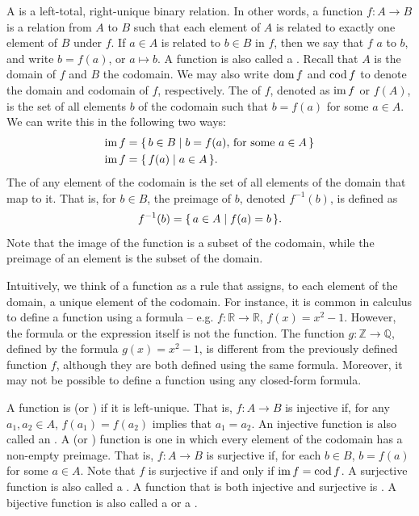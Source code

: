 A  is a left-total, right-unique binary relation. In other words, a function $f \colon A \to B$ is a relation from $A$ to $B$ such that each element of $A$ is related to exactly one element of $B$ under $f$. If $a \in A$ is related to $b \in B$ in $f$, then we say that $f$  $a$ to $b$, and write $b = f(a)$, or $a \mapsto b$. A function is also called a . Recall that $A$ is the domain of $f$ and $B$ the codomain. We may also write $\operatorname{dom} f$ and $\operatorname{cod} f$ to denote the domain and codomain of $f$, respectively. The  of $f$, denoted as $\operatorname{im} f$ or $f(A)$, is the set of all elements $b$ of the codomain such that $b = f(a)$ for some $a \in A$. We can write this in the following two ways:
\begin{align*}
\operatorname{im} f & = \qty{\, b \in B \mid b = f(a),\, \text{for some}~ a \in A \,} \\
\operatorname{im} f & = \qty{\, f(a) \mid a \in A \,}.
\end{align*}
The  of any element of the codomain is the set of all elements of the domain that map to it. That is, for $b \in B$, the preimage of $b$, denoted $f^{-1}(b)$, is defined as
\begin{equation*}
f^{-1}(b) = \qty{\, a \in A \mid f(a) = b \,}.
\end{equation*}
Note that the image of the function is a subset of the codomain, while the preimage of an element is the subset of the domain.

\begin{Note*}
Intuitively, we think of a function as a rule that assigns, to each element of the domain, a unique element of the codomain. For instance, it is common in calculus to define a function using a formula -- e.g. $f \colon \mathbb R \to \mathbb R$, $f(x) = x^2 - 1$. However, the formula or the expression itself is not the function. The function $g \colon \mathbb Z \to \mathbb Q$, defined by the formula $g(x) = x^2 - 1$, is different from the previously defined function $f$, although they are both defined using the same formula. Moreover, it may not be possible to define a function using any closed-form formula.
\end{Note*}

A function is  (or ) if it is left-unique. That is, $f \colon A \to B$ is injective if, for any $a_1, a_2 \in A$, $f(a_1) = f(a_2)$ implies that $a_1 = a_2$. An injective function is also called an . A  (or ) function is one in which every element of the codomain has a non-empty preimage. That is, $f \colon A \to B$ is surjective if, for each $b \in B$, $b = f(a)$ for some $a \in A$. Note that $f$ is surjective if and only if $\operatorname{im} f = \operatorname{cod} f$. A surjective function is also called a . A function that is both injective and surjective is . A bijective function is also called a  or a .

